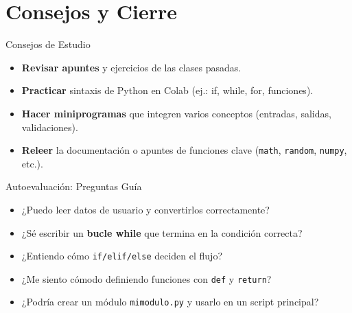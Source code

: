 \documentclass[10pt]{beamer}
\begin{document}
\section{Consejos y Cierre}

\begin{frame}{Consejos de Estudio}
  \begin{itemize}
    \item \textbf{Revisar apuntes} y ejercicios de las clases pasadas.
    \item \textbf{Practicar} sintaxis de Python en Colab (ej.: if, while, for, funciones).
    \item \textbf{Hacer miniprogramas} que integren varios conceptos (entradas, salidas, validaciones).
    \item \textbf{Releer} la documentación o apuntes de funciones clave (\texttt{math}, \texttt{random}, \texttt{numpy}, etc.).
  \end{itemize}
\end{frame}

\begin{frame}{Autoevaluación: Preguntas Guía}
  \begin{itemize}
    \item ¿Puedo leer datos de usuario y convertirlos correctamente?
    \item ¿Sé escribir un \textbf{bucle while} que termina en la condición correcta?
    \item ¿Entiendo cómo \texttt{if/elif/else} deciden el flujo?
    \item ¿Me siento cómodo definiendo funciones con \texttt{def} y \texttt{return}?
    \item ¿Podría crear un módulo \texttt{mimodulo.py} y usarlo en un script principal?
  \end{itemize}
\end{frame}
\end{document}
